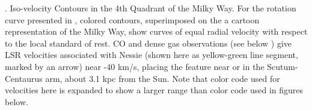 \textbf{\label{fig:topview}}. Iso-velocity Contours in the 4th Quadrant of the Milky Way. For the rotation curve presented in \citet{McClureGriffiths2007}, colored contours, superimposed on the a cartoon representation of the Milky Way, show curves of equal radial velocity with respect to the local standard of rest. CO and dense gas observations (see below ) give LSR velocities associated with Nessie (shown here as yellow-green line segment, marked by an arrow) near -40 km/s, placing the feature near or in the Scutum-Centaurus arm, about 3.1 kpc from the Sun.  Note that color code used for velocities here is expanded to show a larger range than color code used in figures below.